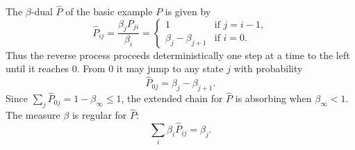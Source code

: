 The $\beta$-dual $\hat{P}$ of the basic example $P$ is given by
$$\hat{P}_{ij} = \frac{\beta_j P_{ji}}{\beta_i} = \begin{cases} 1 & \text{if } j = i - 1, \\[4pt] \beta_j - \beta_{j+1} & \text{if } i = 0. \end{cases}$$
Thus the reverse process proceeds deterministically one step at a time to the left until it reaches $0$. From $0$ it may jump to any state $j$ with probability
$$\hat{P}_{0j} = \beta_j - \beta_{j+1}.$$
Since $\sum_j \hat{P}_{0j} = 1 - \beta_\infty \leq 1$, the extended chain for $\hat{P}$ is absorbing when $\beta_\infty < 1$. The measure $\beta$ is regular for $\hat{P}$:
$$\sum_i \beta_i \hat{P}_{ij} = \beta_j.$$
